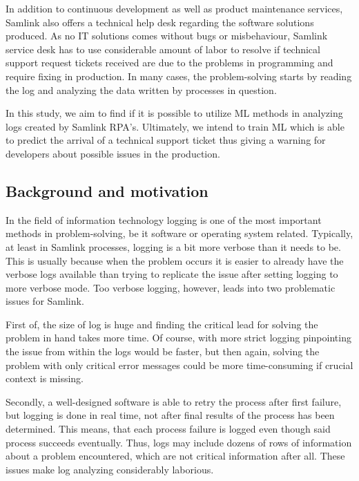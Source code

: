 In addition to continuous development
as well as product maintenance services,
Samlink also offers a technical help desk
regarding the software solutions produced.
As no IT solutions comes without bugs or misbehaviour,
Samlink service desk has to use considerable amount of labor
to resolve if technical support request tickets received
are due to the problems in programming
and require fixing in production.
In many cases,
the problem-solving starts by reading the log
and analyzing the data written by processes in question.

In this study,
we aim to find if it is possible to utilize
ML methods in analyzing logs
created by Samlink RPA's.
Ultimately,
we intend to train ML
which is able to predict the arrival of a technical support ticket
thus giving a warning for developers about possible issues
in the production.


\subsection{Background and motivation}\label{subsec:intro-background-and-motivation}
In the field of information technology
logging is one of the most important methods
in problem-solving,
be it software or operating system related.\cite{delarosa2018log}
Typically,
at least in Samlink processes,
logging is a bit more verbose
than it needs to be.
This is usually because when the problem occurs
it is easier to already have the verbose logs available
than trying to replicate the issue
after setting logging to more verbose mode.
Too verbose logging, however,
leads into two problematic issues for Samlink.

First of, the size of log is huge
and finding the critical lead for
solving the problem in hand
takes more time.
Of course,
with more strict logging
pinpointing the issue from within the logs
would be faster,
but then again,
solving the problem with only critical error messages
could be more time-consuming
if crucial context is missing.

Secondly,
a well-designed software
is able to retry the process after first failure,
but logging is done in real time,
not after final results of the process has been determined.
This means,
that each process failure is logged
even though said process succeeds eventually.
Thus,
logs may include dozens of rows of information about a problem encountered,
which are not critical information after all.
These issues make log analyzing considerably laborious.

